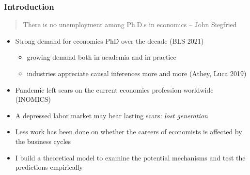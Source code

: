 \documentclass[10pt,svgnames,fragile]{beamer}
\begin{document}
\begin{frame}
	\frametitle{Introduction}
	\begin{quote}
		There is no unemployment among Ph.D.s in economics {\hfill-- John Siegfried}
	\end{quote}
\vfill
	\begin{itemize}
		\item Strong demand for economics PhD over the decade (BLS 2021)
		\begin{itemize}
			\item growing demand both in academia and in practice
			\vspace{1 mm}
			\item industries appreciate causal inferences more and more  (Athey, Luca 2019)
		\end{itemize}
\vfill
		\item Pandemic left scars on the current economics profession worldwide {\footnotesize (INOMICS)}  
\vfill
		\item A depressed labor market may bear lasting scars: \textit{lost generation} 
\vfill
		\item Less work has been done on whether the careers of economists is affected by the business cycles
\vfill
		\item I build a theoretical model to examine the potential mechanisms and test the predictions empirically
\vfill		
	\end{itemize}
\end{frame}
\end{document}

